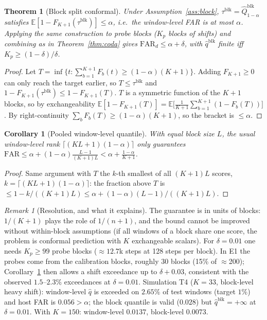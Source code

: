 \documentclass[conference]{IEEEtran}
\newtheorem{theorem}{Theorem}
\newtheorem{corollary}{Corollary}
\theoremstyle{definition}
\theoremstyle{remark}
\newtheorem{remark}{Remark}
\newcommand{\Q}{\widehat Q}
\newcommand{\E}{\mathbb E}
\newcommand{\FAR}{\mathrm{FAR}}
\begin{document}
\begin{theorem}[Block split conformal]\label{thm:block}
Under Assumption~\ref{ass:block}, $\tau^{\mathrm{blk}}=\Q^{\mathrm{blk}}_{1-\alpha}$ satisfies $\E[1-F_{K+1}(\tau^{\mathrm{blk}})]\le\alpha$, i.e.\ the window-level FAR is at most $\alpha$. Applying the same construction to probe blocks ($K_p$ blocks of shifts) and combining as in Theorem~\ref{thm:coda} gives $\FAR_d\le\alpha+\delta$, with $\hat q^{\mathrm{blk}}$ finite iff $K_p\ge(1-\delta)/\delta$.
\end{theorem}
\begin{proof}
Let $T=\inf\{t:\sum_{b=1}^{K+1}F_b(t)\ge(1-\alpha)(K+1)\}$. Adding $F_{K+1}\ge0$ can only reach the target earlier, so $T\le\tau^{\mathrm{blk}}$ and $1-F_{K+1}(\tau^{\mathrm{blk}})\le1-F_{K+1}(T)$. $T$ is a symmetric function of the $K+1$ blocks, so by exchangeability $\E[1-F_{K+1}(T)]=\E\bigl[\tfrac{1}{K+1}\sum_{b=1}^{K+1}(1-F_b(T))\bigr]$. By right-continuity $\sum_bF_b(T)\ge(1-\alpha)(K+1)$, so the bracket is $\le\alpha$.
\end{proof}

\begin{corollary}[Pooled window-level quantile]\label{cor:naive}
With equal block size $L$, the usual window-level rank $\lceil(KL+1)(1-\alpha)\rceil$ only guarantees $\FAR\le\alpha+(1-\alpha)\frac{L-1}{(K+1)L}<\alpha+\frac{1-\alpha}{K+1}$.
\end{corollary}
\begin{proof}
Same argument with $T$ the $k$-th smallest of all $(K+1)L$ scores, $k=\lceil(KL+1)(1-\alpha)\rceil$: the fraction above $T$ is $\le1-k/((K+1)L)\le\alpha+(1-\alpha)(L-1)/((K+1)L)$.
\end{proof}

\begin{remark}[Resolution, and what it explains]
The guarantee is in units of blocks: $1/(K+1)$ plays the role of $1/(n+1)$, and the bound cannot be improved without within-block assumptions (if all windows of a block share one score, the problem is conformal prediction with $K$ exchangeable scalars). For $\delta=0.01$ one needs $K_p\ge 99$ probe blocks ($\approx12.7$k steps at 128 steps per block). In E1 the probes come from the calibration blocks, roughly $30$ blocks (15\% of $\approx$200); Corollary~\ref{cor:naive} then allows a shift exceedance up to $\delta+0.03$, consistent with the observed $1.5$--$2.3\%$ exceedances at $\delta=0.01$. Simulation T4 ($K=33$, block-level heavy shift): window-level $\hat q$ is exceeded on $2.65\%$ of test windows (target $1\%$) and host FAR is $0.056>\alpha$; the block quantile is valid ($0.028$) but $\hat q^{\mathrm{blk}}=+\infty$ at $\delta=0.01$. With $K=150$: window-level $0.0137$, block-level $0.0073$.
\end{remark}
\end{document}
